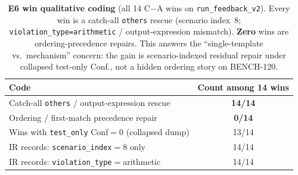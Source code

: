 \begin{table}[t]
  \centering
  \caption{\textbf{E6 win qualitative coding} (all 14 C$-$A wins on
    \texttt{run\_feedback\_v2}).
    Every win is a catch-all \texttt{others} rescue (scenario index~8;
    \texttt{violation\_type=arithmetic} / output-expression mismatch).
    \textbf{Zero} wins are ordering-precedence repairs.
    This answers the ``single-template vs.\ mechanism'' concern: the gain is
    scenario-indexed residual repair under collapsed test-only Conf., not a
    hidden ordering story on BENCH-120.}
  \label{tab:e6-qual}
  \footnotesize
  \renewcommand{\arraystretch}{1.12}
  \begin{tabular}{@{}lc@{}}
    \toprule
    Code & Count among 14 wins \\
    \midrule
    Catch-all \texttt{others} / output-expression rescue
      & \textbf{14/14} \\
    Ordering / first-match precedence repair
      & \textbf{0/14} \\
    Wins with \texttt{test\_only} Conf${=}0$ (collapsed dump)
      & 13/14 \\
    IR records: \texttt{scenario\_index}${=}8$ only
      & 14/14 \\
    IR records: \texttt{violation\_type}${=}$arithmetic
      & 14/14 \\
    \bottomrule
  \end{tabular}
\end{table}
